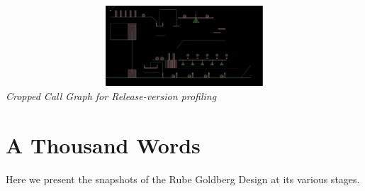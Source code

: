 \documentclass[a4paper,11pt]{article}
\begin{document}
\begin{center}
\includegraphics[width=195mm, height=30mm]{state_00.eps}\\
\emph{Cropped Call Graph for Release-version profiling}
\end{center}


\section{A Thousand Words}

Here we present the snapshots of the Rube Goldberg Design at its various stages.
\end{document}
